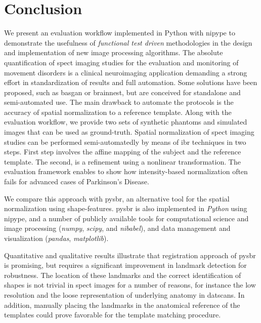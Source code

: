 \documentclass{frontiers}
\begin{document}

\section{Conclusion}
\label{sec:conclusion}
\cbstart
We present an evaluation workflow implemented in Python
  with \gls*{nipype} to demonstrate the usefulness of
  \emph{functional test driven} methodologies in the design
  and implementation of new image processing algorithms.
The absolute quantification of \gls*{spect} imaging studies
  for the evaluation and monitoring of movement disorders is
  a clinical neuroimaging application demanding a strong effort
  in standardization of results and full automation.
Some solutions have been proposed, such as \gls*{basgan} or
  \gls*{brainnest}, but are conceived for standalone and
  semi-automated use.
The main drawback to automate the protocols is the accuracy of
  spatial normalization to a reference template.
Along with the evaluation workflow, we provide two sets of
  synthetic phantoms and simulated images that can be used
  as ground-truth.
Spatial normalization of \gls*{spect} imaging studies can be
  performed semi-automatedly by means of \gls*{ibr} techniques in 
  two steps.
\cbend
First step involves the affine mapping of the subject and the
  reference template.
The second, is a refinement using a nonlinear transformation.
The evaluation framework enables to show 
  how intensity-based normalization often fails
  for advanced cases of Parkinson's Disease.

We compare this approach with \gls*{pysbr}, an alternative tool for the
  spatial normalization using shape-features.
\Gls*{pysbr} is also implemented in \emph{Python} using
  \gls*{nipype}, and a number of publicly available tools
  for computational science and image processing
  (\emph{numpy}, \emph{scipy}, and \emph{nibabel}),
  and data management and visualization (\emph{pandas},
  \emph{matplotlib}).
  
Quantitative and qualitative results illustrate that registration approach
  of \gls*{pysbr} is promising, but requires a significant improvement
  in landmark detection for robustness.
The location of these landmarks and the correct identification of
  shapes is not trivial in \gls*{spect} images for a number of reasons,
  for instance the low resolution and the loose representation of
  underlying anatomy in \glspl*{datscan}.
In addition, manually placing the landmarks in the anatomical reference of the 
  templates could prove favorable for the template matching procedure.
 
\end{document}
